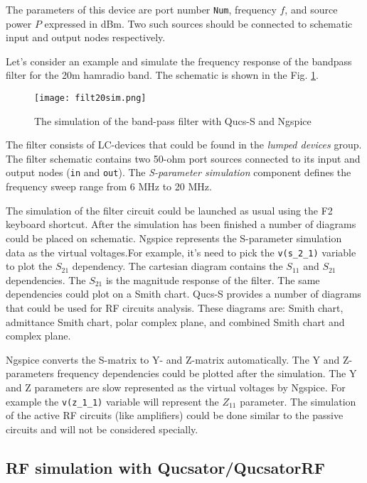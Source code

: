 The parameters of this device are port number \verb|Num|, frequency $f$, and source power $P$ expressed in dBm. Two such sources should be connected to schematic input and output nodes respectively.

Let's consider an example and simulate the frequency response of the bandpass filter for the 20m hamradio band. The schematic is shown in the Fig. \ref{fig:filt20m}.

    \begin{figure}[!ht]
    \begin{center}
        \texttt{[image: filt20sim.png]}
    \end{center}
    \caption{The simulation of the band-pass filter with Qucs-S and Ngspice} \label{fig:filt20m}
    \end{figure}

The filter consists of LC-devices that could be found in the \emph{lumped devices} group. The filter schematic contains two 50-ohm port sources connected to its input and output nodes (\verb|in| and \verb|out|). The \emph{S-parameter simulation} component defines the frequency sweep range from 6 MHz to 20 MHz.

The simulation of the filter circuit could be launched as usual using the F2 keyboard shortcut. After the simulation has been finished a number of diagrams could be placed on schematic. Ngspice represents the S-parameter simulation data as the virtual voltages.For example, it's need to pick the \verb|v(s_2_1)| variable to plot the $S_{21}$ dependency. The cartesian diagram contains the $S_{11}$ and $S_{21}$ dependencies. The $S_{21}$ is the magnitude response of the filter. The same dependencies could plot on a Smith chart. Qucs-S provides a number of diagrams that could be used for RF circuits analysis. These diagrams are: Smith chart, admittance Smith chart, polar complex plane, and combined Smith chart and complex plane.

Ngspice converts the S-matrix to Y- and Z-matrix automatically. The Y and Z-parameters frequency dependencies could be plotted after the simulation. The Y and Z parameters are slow represented as the virtual voltages by Ngspice. For example the \verb|v(z_1_1)| variable will represent the $Z_{11}$ parameter. The simulation of the active RF circuits (like amplifiers) could be done similar to the passive circuits and will not be considered specially.

\subsection{RF simulation with Qucsator/QucsatorRF}

